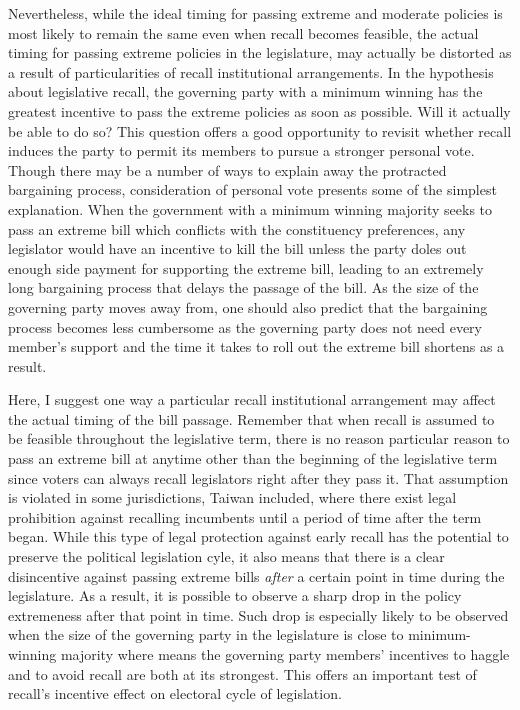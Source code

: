 \documentclass{article}
\begin{document}
		
		
		
		
		Nevertheless,
		while the ideal timing for passing extreme and moderate policies
		is most likely to remain the same even
		when recall becomes feasible,
		the actual timing for passing extreme policies in the legislature,
		may actually be distorted as a result of particularities of recall institutional arrangements.
		In the hypothesis about legislative recall,
		the governing party with a minimum winning
		has the greatest incentive to pass the extreme policies as soon as possible.
		Will it actually be able to do so?
		This question offers a good opportunity
		to revisit whether recall induces the party
		to permit its members to pursue a stronger personal vote.
		Though there may be a number of ways to
		explain away the protracted bargaining process,
		consideration of personal vote presents some of the simplest explanation.
		When the government with a minimum winning majority
		seeks to pass an extreme bill which conflicts with
		the constituency preferences,
		any legislator would have an incentive
		to kill the bill
		unless the party doles out
		enough side payment for supporting the extreme bill,
		leading to an extremely long bargaining process
		that delays the passage of the bill.
		As the size of the governing party moves away from,
		one should also predict that the bargaining process becomes less cumbersome
		as the governing party does not need every member's support
		and the time it takes to roll out the extreme bill
		shortens as a result.
		
		Here, I
		suggest one way
		a particular
		recall institutional arrangement may affect
		the actual timing of the bill passage.
		Remember that
		when recall is assumed to be feasible throughout the legislative term,
		there is no reason particular reason
		to pass an extreme bill at anytime other than the beginning of the legislative term
		since voters can always recall legislators
		right after they pass it.
		That assumption is violated
		in some jurisdictions, Taiwan included,
		where there exist legal prohibition against recalling incumbents
		until a period of time after the term began.
		While this type of legal protection against early recall
		has the potential to preserve the political legislation cyle,
		it also means that there is a clear disincentive
		against passing extreme bills
		\textit{after} a certain point in time during the legislature.
		As a result,
		it is possible to observe a sharp drop in
		the policy extremeness after that point in time.
		Such drop is especially likely to be observed
		when the size of the governing party
		in the legislature is close to minimum-winning majority
		where means the governing party members' incentives
		to haggle and to avoid recall
		are both at its strongest.
		This offers an important test of recall's
		incentive effect on electoral cycle of legislation.
		
\end{document}
